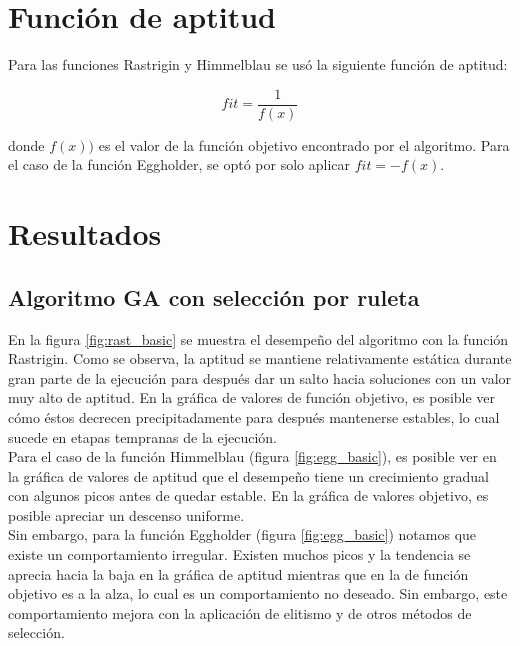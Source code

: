 \documentclass[letterpaper,12pt]{article}
\theoremstyle{definition}
\begin{document}
\section*{Función de aptitud}

Para las funciones Rastrigin y Himmelblau se usó la siguiente función de aptitud:

\begin{equation*}
  fit = \frac{1}{f(x)}
\end{equation*}

donde \(f(x))\) es el valor de la función objetivo encontrado por el algoritmo.
Para el caso de la función Eggholder, se optó por solo aplicar \(fit = -f(x)\).


\section*{Resultados}

\subsection*{Algoritmo GA con selección por ruleta}

En la figura \ref{fig:rast_basic} se muestra el desempeño del algoritmo con la función Rastrigin. Como se observa, la aptitud se mantiene relativamente estática durante gran parte de la ejecución para después dar un salto hacia soluciones con un valor muy alto de aptitud. En la gráfica de valores de función objetivo, es posible ver cómo éstos decrecen precipitadamente para después mantenerse estables, lo cual sucede en etapas tempranas de la ejecución.\\

Para el caso de la función Himmelblau (figura \ref{fig:egg_basic}), es posible ver en la gráfica de valores de aptitud que el desempeño tiene un crecimiento gradual con algunos picos antes de quedar estable. En la gráfica de valores objetivo, es posible apreciar un descenso uniforme.\\

Sin embargo, para la función Eggholder (figura \ref{fig:egg_basic}) notamos que existe un comportamiento irregular. Existen muchos picos y la tendencia se aprecia hacia la baja en la gráfica de aptitud mientras que en la de función objetivo es a la alza, lo cual es un comportamiento no deseado. Sin embargo, este comportamiento mejora con la aplicación de elitismo y de otros métodos de selección.
\end{document}
